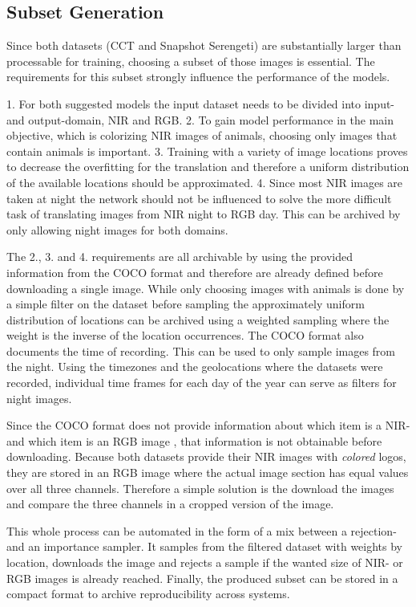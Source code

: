 \documentclass[a4paper,11pt, DIV=12]{scrartcl}
\begin{document}
\subsection{Subset Generation}
Since both datasets (CCT and Snapshot Serengeti) are substantially larger than processable for training, 
choosing a subset of those images is essential. The requirements for this subset strongly influence the performance 
of the models.

1. For both suggested models the input dataset needs to be divided into input- and output-domain, NIR and RGB.
2. To gain model performance in the main objective, which is colorizing NIR images of animals, 
   choosing only images that contain animals is important.
3. Training with a variety of image locations proves to decrease the overfitting for the translation
   and therefore a uniform distribution of the available locations should be approximated.
4. Since most NIR images are taken at night the network should not be influenced to solve the more difficult 
   task of translating images from NIR night to RGB day. This can be archived by only allowing night images for both 
   domains.

The 2., 3. and 4. requirements are all archivable by using the provided information from the COCO format and therefore 
are already defined before downloading a single image. 
While only choosing images with animals is done by a simple filter on the dataset before sampling the approximately uniform distribution 
of locations can be archived using a weighted sampling where the weight is the inverse of the location occurrences.
The COCO format also documents the time of recording. This can be used to only sample images from the night. 
Using the timezones and the geolocations where the datasets were recorded, individual time frames for each day of the year can serve as filters for night images.

Since the COCO format does not provide information about which item is a NIR- and which item is an RGB image \cite{caltech}, that information is not obtainable before downloading.
Because both datasets provide their NIR images with \textit{colored} logos, they are stored in an RGB image where the actual image section has equal values over all three channels.
Therefore a simple solution is the download the images and compare the three channels in a cropped version of the image. 

This whole process can be automated in the form of a mix between a rejection- and an importance sampler. It samples from the filtered dataset with weights by location, downloads the image and 
rejects a sample if the wanted size of NIR- or RGB images is already reached. 
Finally, the produced subset can be stored in a compact format to archive reproducibility across systems.
\end{document}
